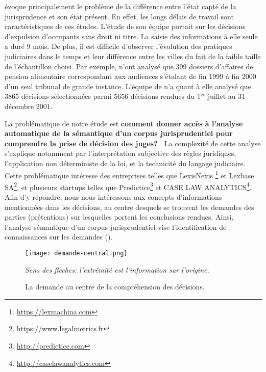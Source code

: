 \citet{ancel2003expulsion} évoque principalement le problème de la différence entre l'état capté de la jurisprudence et son état présent. En effet, les longs délais de travail sont caractéristiques de ces études. L'étude de son équipe portait sur les décisions d'expulsion d'occupants sans droit ni titre. La saisie des informations à elle seule a duré 9 mois.  De plus, il est difficile d'observer l'évolution des pratiques judiciaires dans le temps et leur différence entre les villes du fait de la faible taille de l'échantillon choisi. Par exemple, \citet{jeandidier2006pensions} n'ont analysé que 399 dossiers d'affaires de pension alimentaire correspondant aux audiences s'étalant de fin 1999 à fin 2000 d'un seul tribunal de grande instance. L'équipe de \citet{ancel2003expulsion} n'a quant à elle analysé que 3865 décisions sélectionnées parmi 5656 décisions rendues du 1$^\text{er}$  juillet au 31 décembre 2001. 
 
La problématique de notre étude est \og \textbf{comment donner accès à l'analyse automatique de la sémantique d'un corpus jurisprudentiel pour comprendre la prise de décision des juges?} \fg{}. La complexité de cette analyse s'explique notamment par l'interprétation subjective des règles juridiques, l'application non déterministe de la loi, et la technicité du langage judiciaire. Cette problématique intéresse des entreprises telles que LexisNexis \footnote{\url{https://lexmachina.com}} et Lexbase SA\footnote{\url{https://www.legalmetrics.fr}}, et plusieurs startups  telles que Predictice\footnote{\url{http://predictice.com}} et CASE LAW ANALYTICS\footnote{\url{http://caselawanalytics.com}}. Afin d'y répondre, nous nous intéressons aux concepts d'informations mentionnées dans les décisions, au centre desquels se trouvent les demandes des parties (prétentions) sur lesquelles portent les conclusions rendues. Ainsi, l'analyse sémantique d'un corpus jurisprudentiel vise l'identification de connaissances sur les demandes ().
 \begin{figure}[!htb]
 	\centering
 	\texttt{[image: demande-central.png]}
 	
 	\scriptsize{\textit{Sens des flèches: l'extrémité est l'information sur l'origine.}}
 	\caption{La demande au centre de la compréhension des décisions.}
 	\label{fig:intro:demande-central}
 \end{figure} 

